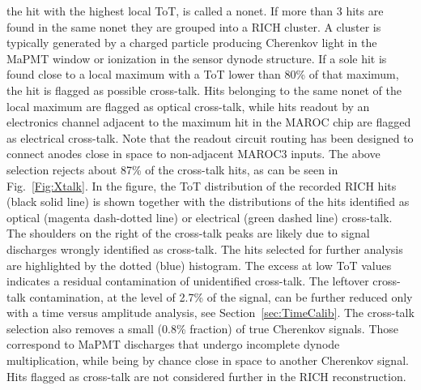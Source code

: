 \documentclass[5p,times,twocolumn]{elsarticle}
\begin{document}
the hit with the highest local ToT, is called a nonet. If more than 3 hits are found in the same nonet they are grouped
into a RICH cluster. A cluster is typically generated by a charged particle producing Cherenkov light in the MaPMT
window or ionization in the sensor dynode structure. 
If a sole hit is found close to a local maximum with a ToT lower than 80\% of that maximum, the hit is flagged as
possible cross-talk. Hits belonging to the same nonet of the local maximum are flagged as optical cross-talk, while hits
readout by an electronics channel adjacent to the maximum hit in the MAROC chip are flagged as electrical
cross-talk. Note that the readout circuit routing has been designed to connect anodes close in space to non-adjacent
MAROC3 inputs. The above selection rejects about 87\% of the cross-talk hits, as can be seen in Fig.~\ref{Fig:Xtalk}.
In the figure, the ToT distribution of the recorded RICH hits (black solid line) is shown together with the
distributions of the hits identified as optical (magenta dash-dotted line) or electrical (green dashed line) cross-talk. The
shoulders on the right of the cross-talk peaks are likely due to signal discharges wrongly identified as cross-talk.
The hits selected for further analysis are highlighted by the dotted (blue) histogram. The excess at low ToT values
indicates a residual contamination of unidentified cross-talk. The leftover cross-talk contamination, at the level of
2.7\% of the signal, can be further reduced only with a time versus amplitude analysis, see Section~\ref{sec:TimeCalib}.
The cross-talk selection also removes a small (0.8\% fraction) of true Cherenkov signals. Those correspond to MaPMT
discharges that undergo incomplete dynode multiplication, while being by chance close in space to another Cherenkov signal.
Hits flagged as cross-talk are not considered further in the RICH reconstruction.
\end{document}
